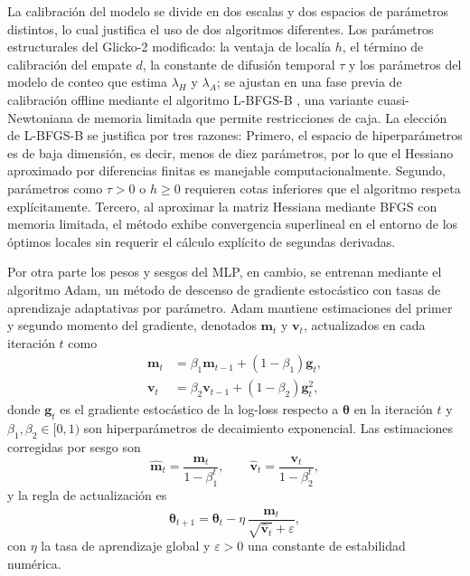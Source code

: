 La calibraci\'on del modelo se divide en dos escalas y dos espacios de par\'ametros distintos, lo cual justifica el uso de dos algoritmos diferentes. Los par\'ametros estructurales del Glicko-2 modificado: la ventaja de local\'ia $h$, el t\'ermino de calibraci\'on del empate $d$, la constante de difusi\'on temporal $\tau$ y los par\'ametros del modelo de conteo que estima $\lambda_H$ y $\lambda_A$; se ajustan en una fase previa de calibraci\'on offline mediante el algoritmo L-BFGS-B \cite{byrd1995limited}, una variante cuasi-Newtoniana de memoria limitada que permite restricciones de caja. La elecci\'on de L-BFGS-B se justifica por tres razones: Primero, el espacio de hiperpar\'ametros es de baja dimensi\'on, es decir, menos de diez par\'ametros, por lo que el Hessiano aproximado por diferencias finitas es manejable computacionalmente. Segundo, par\'ametros como $\tau > 0$ o $h \geq 0$ requieren cotas inferiores que el algoritmo respeta expl\'icitamente. Tercero, al aproximar la matriz Hessiana mediante BFGS con memoria limitada, el m\'etodo exhibe convergencia superlineal en el entorno de los \'optimos locales sin requerir el c\'alculo expl\'icito de segundas derivadas.

Por otra parte los pesos y sesgos del MLP, en cambio, se entrenan mediante el algoritmo Adam, un m\'etodo de descenso de gradiente estoc\'astico con tasas de aprendizaje adaptativas por par\'ametro. Adam mantiene estimaciones del primer y segundo momento del gradiente, denotados $\mathbf{m}_t$ y $\mathbf{v}_t$, actualizados en cada iteraci\'on $t$ como
\begin{align}
	\mathbf{m}_t &= \beta_1\mathbf{m}_{t-1} + (1-\beta_1)\mathbf{g}_t, \\
	\mathbf{v}_t &= \beta_2\mathbf{v}_{t-1} + (1-\beta_2)\mathbf{g}_t^2,
\end{align}
donde $\mathbf{g}_t$ es el gradiente estoc\'astico de la log-loss respecto a $\boldsymbol{\theta}$ en la iteraci\'on $t$ y $\beta_1,\beta_2 \in [0,1)$ son hiperpar\'ametros de decaimiento exponencial. Las estimaciones corregidas por sesgo son
\begin{equation}
	\hat{\mathbf{m}}_t = \frac{\mathbf{m}_t}{1-\beta_1^t}, \qquad \hat{\mathbf{v}}_t = \frac{\mathbf{v}_t}{1-\beta_2^t},
\end{equation}
y la regla de actualizaci\'on es
\begin{equation}
	\boldsymbol{\theta}_{t+1} = \boldsymbol{\theta}_t - \eta\,\frac{\hat{\mathbf{m}}_t}{\sqrt{\hat{\mathbf{v}}_t}+\varepsilon},
\end{equation}
con $\eta$ la tasa de aprendizaje global y $\varepsilon > 0$ una constante de estabilidad num\'erica.


